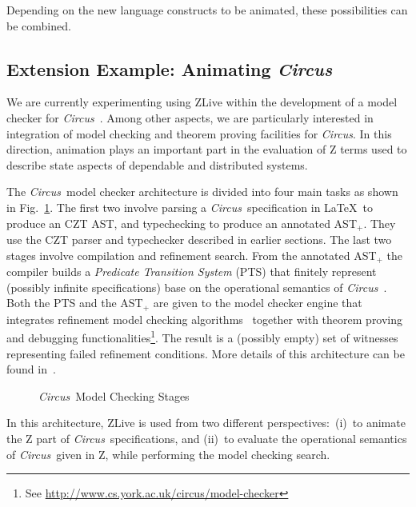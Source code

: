 \documentclass{llncs}
\newcommand{\Circus}{{\sf\slshape Circus}}
\begin{document}
    Depending on the new language constructs to be animated, these
    possibilities can be combined.

\subsection{Extension Example: Animating \Circus}

    We are currently experimenting using ZLive within the development
    of a model checker for \Circus~\cite{circus.mc:leo}. Among other aspects,
    we are particularly interested in integration of model checking and
    theorem proving facilities for \Circus. In this direction, animation plays
    an important part in the evaluation of Z terms used to describe state
    aspects of dependable and distributed systems.

    The \Circus\ model checker architecture is divided into four main
    tasks as shown in Fig.~\ref{mc-stages}.  The first two involve
    parsing a \Circus\ specification in \LaTeX\ to produce an CZT AST,
    and typechecking to produce an annotated AST$_{+}$.  They use the
    CZT parser and typechecker described in earlier sections.  The
    last two stages involve compilation and refinement search.  From
    the annotated AST$_{+}$ the compiler builds a \textit{Predicate
    Transition System} (PTS) that finitely represent (possibly
    infinite specifications) base on the operational semantics of
    \Circus~\cite{circus.mc:opsem}. Both the PTS and the AST$_{+}$ are
    given to the model checker engine that integrates refinement model
    checking algorithms~\cite{csp.mc:main,csp.mc:bisequiv} together
    with theorem proving and debugging
    functionalities\footnote{See
    \url{http://www.cs.york.ac.uk/circus/model-checker}}.
    The result is a (possibly empty) set of witnesses representing
    failed refinement conditions. More details of this architecture
    can be found in~\cite{circus.mc:leo}.  \begin{figure}[t]
    \begin{center} 
    \end{center} \caption{\Circus\ Model Checking
    Stages}\label{mc-stages} \end{figure}

    In this architecture, ZLive is used from two different
    perspectives:~(i)~to animate the Z part of \Circus\ specifications, and
    (ii)~to evaluate the operational semantics of \Circus\ given in Z,
    while performing the model checking search.
\end{document}
